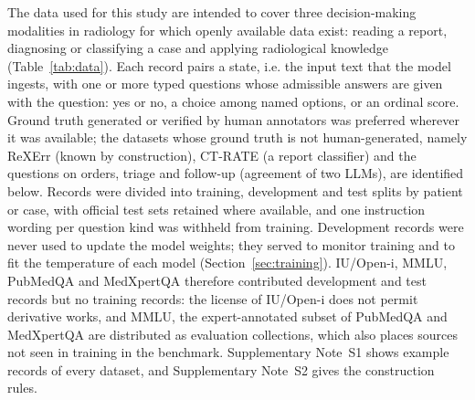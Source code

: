 \documentclass[11pt]{article}
\begin{document}
The data used for this study are intended to cover three decision-making modalities in radiology for which openly available data exist: reading a report, diagnosing or classifying a case and applying radiological knowledge (Table~\ref{tab:data}). Each record pairs a state, i.e. the input text that the model ingests, with one or more typed questions whose admissible answers are given with the question: yes or no, a choice among named options, or an ordinal score. Ground truth generated or verified by human annotators was preferred wherever it was available; the datasets whose ground truth is not human-generated, namely ReXErr (known by construction), CT-RATE (a report classifier) and the questions on orders, triage and follow-up (agreement of two LLMs), are identified below. Records were divided into training, development and test splits by patient or case, with official test sets retained where available, and one instruction wording per question kind was withheld from training. Development records were never used to update the model weights; they served to monitor training and to fit the temperature of each model (Section~\ref{sec:training}). IU/Open-i, MMLU, PubMedQA and MedXpertQA therefore contributed development and test records but no training records: the license of IU/Open-i does not permit derivative works, and MMLU, the expert-annotated subset of PubMedQA and MedXpertQA are distributed as evaluation collections, which also places sources not seen in training in the benchmark. Supplementary Note~S1 shows example records of every dataset, and Supplementary Note~S2 gives the construction rules.

\begin{table}[!h]
  \caption{Data used in this study. Train and Dev, records used for training and development; Test, questions held out of training; a dash indicates no records. The radiology benchmark comprises  of the test questions. The others are the classifier-labeled structured label extraction questions, the LLM-labeled questions on orders, triage and follow-up, and the external test: radiologist-annotated CT and MRI reports from another institution, analyzed separately from the benchmark to assess generalization. Section~\ref{sec:data} describes each dataset.}
  \label{tab:data}
  \centering\small\setlength{\tabcolsep}{4pt}
  
\end{table}
\end{document}
